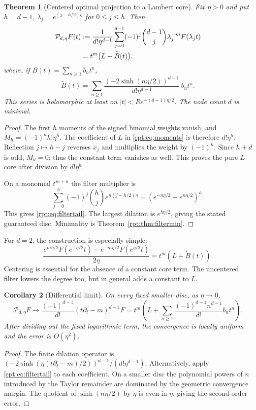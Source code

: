 \documentclass[11pt,a4paper]{article}
\numberwithin{equation}{section}
\newtheorem{theorem}{Theorem}[section]
\newtheorem{corollary}[theorem]{Corollary}
\theoremstyle{definition}\newtheorem{definition}[theorem]{Definition}
\theoremstyle{remark}\newtheorem{remark}[theorem]{Remark}
\begin{document}
\begin{theorem}[Centered optimal projection to a Lambert core]
\label{rpt:thm:projection}
Fix $\eta>0$ and put $h=d-1$, $\lambda_j=e^{(j-h/2)\eta}$ for $0\le j\le h$. Then
\begin{align}
\mathcal P_{d,\eta}F(t)
&:=\frac{1}{d!\eta^{d-1}}
\sum_{j=0}^{d-1}(-1)^j\binom{d-1}{j}
\lambda_j^{-m}F(\lambda_jt)
\notag\\
&=t^m\bigl(L+\widetilde B(t)\bigr),
\label{rpt:eq:projection}
\end{align}
where, if $B(t)=\sum_{n\ge1}b_nt^n$,
\begin{equation}
\widetilde B(t)=\sum_{n\ge1}
\frac{(-2\sinh(n\eta/2))^{d-1}}{d!\eta^{d-1}}\,b_nt^n.
\label{rpt:eq:filtertail}
\end{equation}
This series is holomorphic at least on $|t|<R e^{-(d-1)\eta/2}$. The node count $d$ is minimal.
\end{theorem}
\begin{proof}
The first $h$ moments of the signed binomial weights vanish, and $M_h=(-1)^h h!\eta^h$. The coefficient of $L$ in \eqref{rpt:eq:moments} is therefore $d!\eta^h$. Reflection $j\mapsto h-j$ reverses $x_j$ and multiplies the weight by $(-1)^h$. Since $h+d$ is odd, $M_d=0$; thus the constant term vanishes as well. This proves the pure $L$ core after division by $d!\eta^h$.

On a monomial $t^{m+n}$ the filter multiplier is
\[
\sum_{j=0}^{h}(-1)^j\binom hj e^{n(j-h/2)\eta}
=(e^{-n\eta/2}-e^{n\eta/2})^h.
\]
This gives \eqref{rpt:eq:filtertail}. The largest dilation is $e^{h\eta/2}$, giving the stated guaranteed disc. Minimality is Theorem~\ref{rpt:thm:filtermin}.
\end{proof}

For $d=2$, the construction is especially simple:
\[
\frac{e^{m\eta/2}F(e^{-\eta/2}t)-e^{-m\eta/2}F(e^{\eta/2}t)}{2\eta}
=t^m(L+\widetilde B(t)).
\]
Centering is essential for the absence of a constant core term. The uncentered filter lowers the degree too, but in general adds a constant to $L$.

\begin{corollary}[Differential limit]
\label{rpt:cor:difffilter}
On every fixed smaller disc, as $\eta\to0$,
\begin{equation}
\mathcal P_{d,\eta}F\longrightarrow
\frac{(-1)^{d-1}}{d!}(t\partial_t-m)^{d-1}F
=t^m\left(L+\sum_{n\ge1}\frac{(-1)^{d-1}n^{d-1}}{d!}b_nt^n\right).
\end{equation}
After dividing out the fixed logarithmic term, the convergence is locally uniform and the error is $O(\eta^2)$.
\end{corollary}
\begin{proof}
The finite dilation operator is
$(-2\sinh(\eta(t\partial_t-m)/2))^{d-1}/(d!\eta^{d-1})$.
Alternatively, apply \eqref{rpt:eq:filtertail} to each coefficient. On a smaller disc the polynomial powers of $n$ introduced by the Taylor remainder are dominated by the geometric convergence margin. The quotient of $\sinh(n\eta/2)$ by $\eta$ is even in $\eta$, giving the second-order error.
\end{proof}
\end{document}
